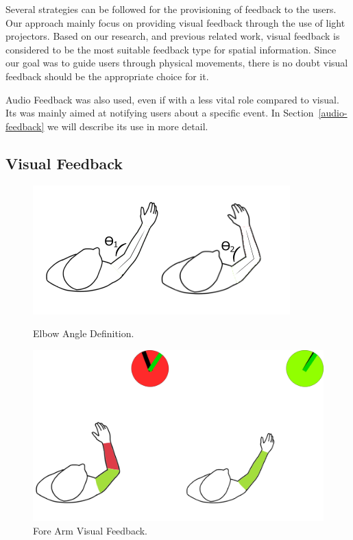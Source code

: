 Several strategies can be followed for the provisioning of feedback to the users. 
Our approach mainly focus on providing visual feedback through the use of light projectors. 
Based on our research, and previous related work, visual feedback is considered to be the most suitable feedback type for spatial information. 
Since our goal was to guide users through physical movements, there is no doubt visual feedback should be the appropriate choice for it.

Audio Feedback was also used, even if with a less vital role compared to visual.
Its was mainly aimed at notifying users about a specific event. In Section~\ref{audio-feedback} we will describe its use in more detail.


\subsection{Visual Feedback}
\label{vision-feedback}


\begin{figure}[!t]
  \centering
  \includegraphics[width=0.7\linewidth]{imgs/approach/elbowangle}
    \caption{Elbow Angle Definition.}
    \label{fig:elbowangle}
    \endminipage\hfill
{}
  \centering
  \includegraphics[width=0.9\linewidth]{imgs/approach/forearmfeedback}
    \caption{Fore Arm Visual Feedback.}
    \label{fig:forearmfeedback}
    \endminipage
\end{figure}



